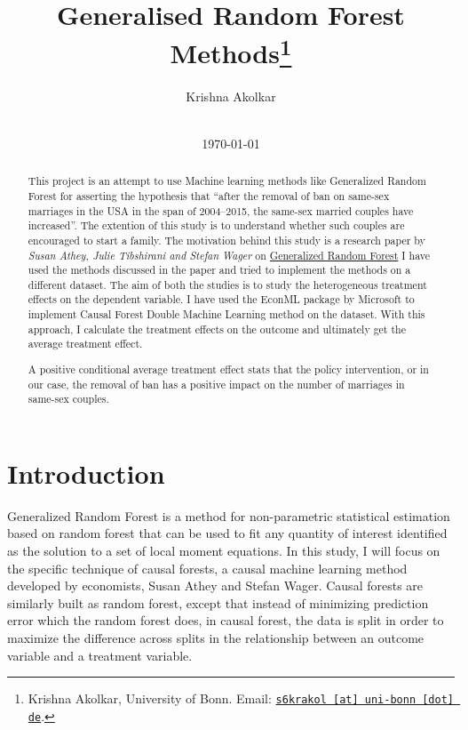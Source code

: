\documentclass[11pt, a4paper, leqno]{article}
\begin{document}
\title{Generalised Random Forest Methods\thanks{Krishna Akolkar, University of Bonn. Email: \href{mailto:s6krakol@uni-bonn.de}{\nolinkurl{s6krakol [at] uni-bonn [dot] de}}.}}

\author{Krishna Akolkar}

\date{
    \\[1ex]
    \today
}
\maketitle
\begin{abstract}
    This project is an attempt to use Machine learning methods like Generalized Random Forest for asserting the hypothesis that
    ``after the removal of ban on same-sex marriages in the USA in the span of 2004--2015, the same-sex married couples have increased''.
    The extention of this study is to understand whether such couples are encouraged to start a family.
    The motivation behind this
    study is a research paper by \textit{Susan Athey, Julie Tibshirani and Stefan Wager} on \href{https://arxiv.org/pdf/1610.01271}{Generalized Random Forest}
    I have used the methods discussed in the paper and tried to implement the methods on a different dataset.
    The aim of both the studies is to study the heterogeneous treatment effects on the dependent variable.
    I have used the EconML package by Microsoft to implement Causal Forest Double Machine Learning method on the dataset.
    With this approach, I calculate the treatment effects on the outcome and ultimately get the average treatment effect.

    A positive conditional average treatment effect stats that the policy intervention, or in our case, the removal of ban has a positive
    impact on the number of marriages in same-sex couples.
\end{abstract}

\clearpage

\section{Introduction}\label{sec:introduction}

 Generalized Random Forest is a method for non-parametric statistical estimation based on random forest that can be used to fit any quantity
 of interest identified as the solution to a set of local moment equations.
 In this study, I will focus on the specific technique of causal forests, a causal machine learning method developed by economists, Susan Athey and Stefan Wager.
 Causal forests are similarly built as random forest, except that instead of minimizing prediction error which the random forest does, in causal forest, the data is split in order to
 maximize the difference across splits in the relationship between an outcome variable and a treatment variable.
\end{document}
